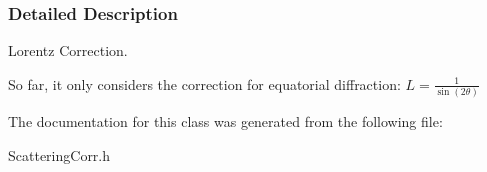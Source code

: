 \subsubsection{\-Detailed \-Description}
\-Lorentz \-Correction. 

\-So far, it only considers the correction for equatorial diffraction\-: $ L = \frac{1}{\sin(2\theta)} $ 

\-The documentation for this class was generated from the following file\-:\begin{DoxyCompactItemize}
\item 
\-Scattering\-Corr.\-h\end{DoxyCompactItemize}
